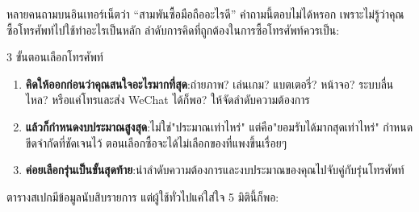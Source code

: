 


หลายคนถามบนอินเทอร์เน็ตว่า “สามพันซื้อมือถืออะไรดี” คำถามนี้ตอบไม่ได้หรอก เพราะไม่รู้ว่าคุณซื้อโทรศัพท์ไปใช้ทำอะไรเป็นหลัก ลำดับการคิดที่ถูกต้องในการซื้อโทรศัพท์ควรเป็น:

\begin{tcbinfo}{3 ขั้นตอนเลือกโทรศัพท์}
\begin{enumerate}
  \item \textbf{คิดให้ออกก่อนว่าคุณสนใจอะไรมากที่สุด}:ถ่ายภาพ? เล่นเกม? แบตเตอรี่? หน้าจอ? ระบบลื่นไหล? หรือแค่โทรและส่ง WeChat ได้ก็พอ? ให้จัดลำดับความต้องการ
  \item \textbf{แล้วก็กำหนดงบประมาณสูงสุด}:ไม่ใช่"ประมาณเท่าไหร่" แต่คือ"ยอมรับได้มากสุดเท่าไหร่" กำหนดขีดจำกัดที่ชัดเจนไว้ ตอนเลือกซื้อจะได้ไม่เลือกของที่แพงขึ้นเรื่อยๆ
  \item \textbf{ค่อยเลือกรุ่นเป็นขั้นสุดท้าย}:นำลำดับความต้องการและงบประมาณของคุณไปจับคู่กับรุ่นโทรศัพท์
\end{enumerate}

\end{tcbinfo}


ตารางสเปกมีข้อมูลนับสิบรายการ แต่ผู้ใช้ทั่วไปแค่ใส่ใจ 5 มิตินี้ก็พอ:


